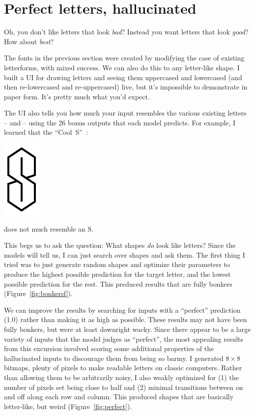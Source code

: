 \documentclass[twocolumn]{article}
\begin{document}
\section{Perfect letters, hallucinated} \label{sec:hallucination}

Oh, you don't like letters that look {\em bad}? Instead you want
letters that look {\em good}? How about {\em best}?

The fonts in the previous section were created by modifying the case
of existing letterforms, with mixed success. We can also do this to
any letter-like shape. I built a UI for drawing letters and seeing
them uppercased and lowercased (and then re-lowercased and
re-uppercased) live, but it's impossible to demonstrate in paper form.
It's pretty much what you'd expect.

The UI also tells you how much your input resembles the various
existing letters -- and
-- using the 26 bonus outputs that each
model predicts. For example, I learned that the
``Cool~S''~\cite{wikipediacools}:

\begin{center}
\includegraphics[width=0.1 \linewidth]{cools}
\end{center}

\noindent does not much resemble an S.

This begs us to ask the question: What shapes {\em do} look like
letters? Since the models will tell us, I can just search over shapes
and ask them. The first thing I tried was to just generate random
shapes and optimize their parameters to produce the highest possible
prediction for the target letter, and the lowest possible prediction
for the rest. This preduced results that are fully bonkers
(Figure~\ref{fig:bonkersf}).

We can improve the results by searching for inputs with a ``perfect''
prediction (1.0) rather than making it as high as possible. These
results may not have been fully bonkers, but were at least downright
wacky. Since there appear to be a large variety of inputs that the
model judges as ``perfect'', the most appealing results from this
excursion involved scoring some additional properties of the
hallucinated inputs to discourage them from being so barmy. I
generated $8 \times 8$ bitmaps, plenty of pixels to make readable
letters on classic computers. Rather than allowing them to be
arbitrarily noisy, I also weakly optimized for (1) the number of
pixels set being close to half and (2) minimal transitions between on
and off along each row and column. This produced shapes that are
basically letter-like, but weird (Figure~\ref{fig:perfect}).
\end{document}

